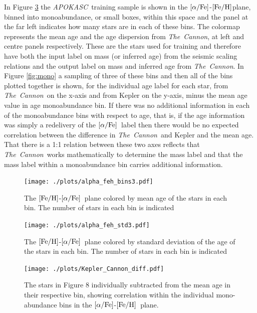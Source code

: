 \documentclass[12pt, preprint]{aastex}
\newcommand{\project}[1]{\textsl{#1}}
\newcommand{\tc}{\project{The~Cannon}}
\newcommand{\apokasc}{\project{APOKASC}}
\newcommand{\feh}{\mbox{$\rm [Fe/H]$}}
\newcommand{\alphafe}{\mbox{$\rm [\alpha/Fe]$}}
\begin{document}
In Figure \ref{fig:alphabins} the \apokasc\ training sample is shown in the \alphafe-\feh plane, binned into monoabundance, or small boxes, within this space and the panel at the far left indicates how many stars are in each of these bins. The colormap represents the mean age and the age dispersion from \tc, at left and centre panels respectively. These are the stars used for training and therefore have both the input label on mass (or inferred age) from the seismic scaling relations and the output label on mass and inferred age from \tc. In Figure \ref{fig:mono} a sampling of three of these bins and then all of the bins plotted together is shown, for the individual age label for each star, from \tc\ on the x-axis and from Kepler on the y-axis, minus the mean age value in age monoabundance bin. If there was no additional information in each of the monoabundance bins with respect to age, that is, if the age information was simply a redelivery of the \alphafe\ label then there would be no expected correlation between the difference in \tc\ and Kepler and the mean age. That there is a 1:1 relation between these two axes reflects that \tc\ works mathematically to determine the mass label and that the mass label within a monoabundance bin carries additional information.

\begin{figure}[p!]
\centering
 \texttt{[image: ./plots/alpha\_feh\_bins3.pdf]}
    \caption{The \feh-\alphafe\ plane colored by mean age of the stars in each bin. The number of stars in each bin is indicated }
\label{fig:alphabins}
\end{figure}

\begin{figure}[p!]
\centering
 \texttt{[image: ./plots/alpha\_feh\_std3.pdf]}
    \caption{The \feh-\alphafe\ plane colored by standard deviation of the age of the stars in each bin. The number of stars in each bin is indicated }
\label{fig:alphabins}
\end{figure}

\begin{figure}[p!]
\centering
 \texttt{[image: ./plots/Kepler\_Cannon\_diff.pdf]}
    \caption{The stars in Figure 8 individually subtracted from the mean age in their respective bin, showing correlation within the individual mono-abundance bins in the \alphafe-\feh\ plane. }
\label{fig:alphabins}
\end{figure}
\end{document}
